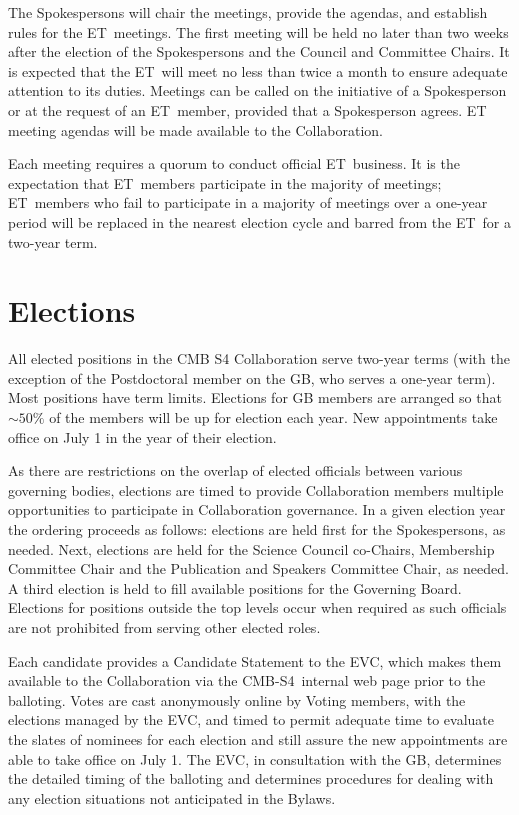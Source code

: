 \documentclass[12pt]{article}
\newcommand{\exec}{{Executive Team}}
\newcommand{\shorte}{{ET}}  %
\newcommand\collabname{CMB-S4}
\begin{document}
The Spokespersons will chair the meetings, provide the agendas, and establish rules for the \shorte\ meetings. The first meeting will be held no later than two weeks after the election of the Spokespersons and the Council and Committee Chairs. It is expected that the \shorte\ will meet no less than twice a month to ensure adequate attention to its duties. Meetings can be called on the initiative of a Spokesperson or at the request of an \shorte\ member, provided that a Spokesperson agrees. ET meeting agendas will be made available to the Collaboration.

Each meeting requires a quorum to conduct official \shorte\ business.  It is the expectation that \shorte\ members participate in the majority of meetings; \shorte\ members who fail to participate in a majority of meetings over a one-year period will be replaced in the nearest election cycle and barred from the \shorte\ for a two-year term.

\section{Elections}\label{sec:elections}

All elected positions in the CMB S4 Collaboration serve two-year terms (with the exception of the Postdoctoral member on the GB, who serves a one-year term). Most positions have term limits.  Elections for GB members are  arranged so that $\sim 50\%$ of the members will be up for election each year. New appointments take office on July 1 in the year of their election.

As there are restrictions on the overlap of elected officials between various governing bodies, elections are timed to provide Collaboration members multiple opportunities to participate in Collaboration governance. In a given election year the ordering proceeds as follows: elections are held first for the Spokespersons, as needed. Next, elections are held for the Science Council co-Chairs, Membership Committee Chair and the Publication and Speakers Committee Chair, as needed.  A third election is held to fill available positions for the Governing Board. Elections for positions outside the top levels occur when required as such officials are not prohibited from serving other elected roles.

Each candidate provides a Candidate Statement to the EVC, which makes them available to the Collaboration via the \collabname\  internal web page prior to the balloting. Votes are cast anonymously online by Voting members, with the elections managed by the EVC, and timed to permit adequate time to evaluate the slates of nominees for each election and still assure the new appointments are able to take office on July 1.  The EVC, in consultation with the GB,  determines the detailed timing of the balloting and determines procedures for dealing with any election situations not anticipated in the Bylaws.
\end{document}
